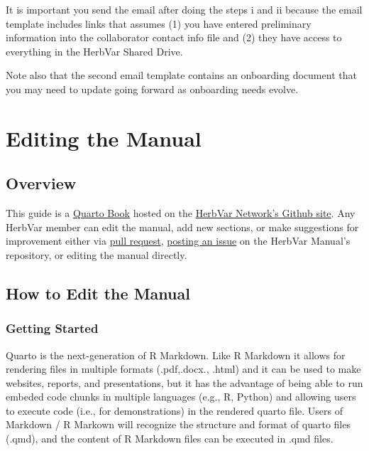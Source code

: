 \documentclass[
  letterpaper,
  oneside,
  open=any]{scrbook}
\begin{document}
It is important you send the email after doing the steps i and ii
because the email template includes links that assumes (1) you have
entered preliminary information into the collaborator contact info file
and (2) they have access to everything in the HerbVar Shared Drive.

Note also that the second email template contains an onboarding document
that you may need to update going forward as onboarding needs evolve.

\chapter{Editing the Manual}\label{sec-manual}

\section{Overview}\label{overview-5}

This guide is a \href{https://quarto.org/docs/books}{Quarto Book} hosted
on the \href{https://github.com/HerbVar-Network}{HerbVar Network's
Github site}. Any HerbVar member can edit the manual, add new sections,
or make suggestions for improvement either via
\href{https://github.com/HerbVar-Network/project_manual/pulls}{pull
request},
\href{https://github.com/HerbVar-Network/project_manual/issues}{posting
an issue} on the HerbVar Manual's repository, or editing the manual
directly.

\section{How to Edit the Manual}\label{how-to-edit-the-manual}

\subsection{Getting Started}\label{getting-started}

Quarto is the next-generation of R Markdown. Like R Markdown it allows
for rendering files in multiple formats (.pdf,.docx., .html) and it can
be used to make websites, reports, and presentations, but it has the
advantage of being able to run embeded code chunks in multiple languages
(e.g., R, Python) and allowing users to execute code (i.e., for
demonstrations) in the rendered quarto file. Users of Markdown / R
Markown will recognize the structure and format of quarto files (.qmd),
and the content of R Markdown files can be executed in .qmd files.
\end{document}
